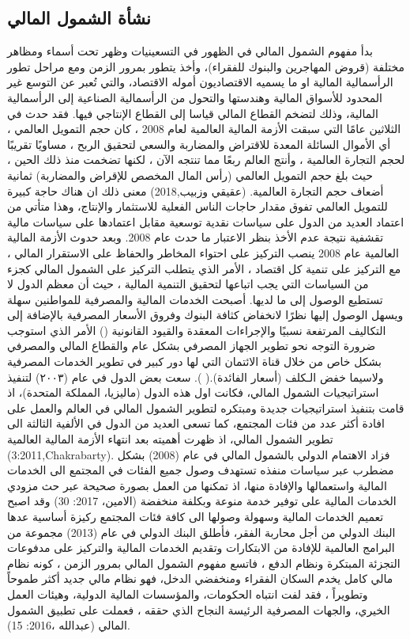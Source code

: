 \documentclass[10pt,a4paper]{report}
\begin{document}
\begin{doublespacing}
\subsection{نشأة الشمول المالي}
بدأ مفهوم الشمول المالي في الظهور في التسعينيات وظهر تحت أسماء ومظاهر مختلفة (قروض المهاجرين والبنوك للفقراء)، وأخذ يتطور بمرور الزمن ومع مراحل تطور الرأسمالية المالية او ما يسميه الاقتصاديون أموله الاقتصاد، والتي تُعبر عن التوسع غير المحدود للأسواق المالية وهندستها والتحول من الرأسمالية الصناعية إلى الرأسمالية المالية، وذلك لتضخم القطاع المالي قياسا إلى القطاع الإنتاجي فيها. فقد حدث في الثلاثين عامًا التي سبقت الأزمة المالية العالمية لعام 2008 ، كان حجم التمويل العالمي ، أي الأموال السائلة المعدة للاقتراض والمضاربة والسعي لتحقيق الربح ، مساويًا تقريبًا لحجم التجارة العالمية ، وأنتج العالم ربعًا مما تنتجه الآن ، لكنها تضخمت منذ ذلك الحين ، حيث بلغ حجم التمويل العالمي (رأس المال المخصص للإقراض والمضاربة) ثمانية أضعاف حجم التجارة العالمية. (عقيقي وزبيب,2018) معنى ذلك ان هناك حاجة كبيرة للتمويل العالمي تفوق مقدار حاجات الناس الفعلية للاستثمار والإنتاج، وهذا متأتي من اعتماد العديد من الدول على سياسات نقدية توسعية مقابل اعتمادها على سياسات مالية تقشفية نتيجة عدم الأخذ بنظر الاعتبار ما حدث عام 2008. وبعد حدوث الأزمة المالية العالمية عام 2008 ينصب التركيز على احتواء المخاطر والحفاظ على الاستقرار المالي ، مع التركيز على تنمية كل اقتصاد ، الأمر الذي يتطلب التركيز على الشمول المالي كجزء من السياسات التي يجب اتباعها لتحقيق التنمية المالية ، حيث أن معظم الدول لا تستطيع الوصول إلى ما لديها. أصبحت الخدمات المالية والمصرفية للمواطنين سهلة ويسهل الوصول إليها نظرًا لانخفاض كثافة البنوك وفروق الأسعار المصرفية بالإضافة إلى التكاليف المرتفعة نسبيًا والإجراءات المعقدة والقيود القانونية () الأمر الذي استوجب ضرورة التوجه نحو تطوير الجهاز المصرفي بشكل عام والقطاع المالي والمصرفي بشكل خاص من خلال قناة الائتمان التي لها دور كبير في تطوير الخدمات المصرفية ولاسيما خفض الـكلف (أسعار الفائدة).( ).
سعت بعض الدول في عام (۲۰۰۳) لتنفيذ استراتيجيات الشمول المالي، فكانت اول هذه الدول (ماليزيا، المملكة المتحدة)، اذ قامت بتنفيذ استراتيجيات جديدة ومبتكره لتطوير الشمول المالي في العالم والعمل على افادة أكثر عدد من فئات المجتمع، كما تسعى العديد من الدول في الألفية الثالثة الى تطوير الشمول المالي، اذ ظهرت أهميته بعد انتهاء الأزمة المالية العالمية (3:2011,Chakrabarty). فزاد الاهتمام الدولي بالشمول المالي في عام (2008) بشكل مضطرب عبر سياسات منفذه تستهدف وصول جميع الفئات في المجتمع الى الخدمات المالية واستعمالها والإفادة منها، اذ تمكنها من العمل بصورة صحيحة عبر حث مزودي الخدمات المالية على توفير خدمة منوعة وبكلفة منخفضة (الامین، 2017: 30) وقد اصبح تعميم الخدمات المالية وسهولة وصولها الى كافة فئات المجتمع ركيزة أساسية عدها البنك الدولي من أجل محاربة الفقر، فأطلق البنك الدولي في عام (2013) مجموعة من البرامج العالمية للإفادة من الابتكارات وتقديم الخدمات المالية والتركيز على مدفوعات التجزئة المبتكرة ونظام الدفع ، فاتسع مفهوم الشمول المالي بمرور الزمن ، كونه نظام مالي كامل يخدم السكان الفقراء ومنخفضي الدخل، فهو نظام مالي جديد أكثر طموحاً وتطويراً ، فقد لفت انتباه الحكومات، والمؤسسات المالية الدولية، وهيئات العمل الخيري، والجهات المصرفية الرئيسة النجاح الذي حققه ، فعملت على تطبيق الشمول المالي (عبدالله ،2016: 15).

\end{doublespacing}
\end{document}
